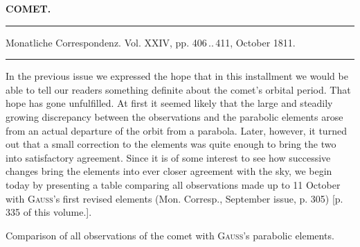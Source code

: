 \clearpage{}\hypertarget{native-343-lower}{}\label{native-343-lower}
\begin{center}\textbf{COMET.}\par\vspace{4pt}\hrule\vspace{4pt}\fontsize{10}{12}\selectfont Monatliche Correspondenz. Vol. XXIV, pp. 406\,..\,411, October 1811.\par\vspace{4pt}\hrule\vspace{4pt}\end{center}

\par\indent In the previous issue we expressed the hope that in this installment we would be able to tell our readers something definite about the comet’s orbital period. That hope has gone unfulfilled. At first it seemed likely that the large and steadily growing discrepancy between the observations and the parabolic elements arose from an actual departure of the orbit from a parabola. Later, however, it turned out that a small correction to the elements was quite enough to bring the two into satisfactory agreement. Since it is of some interest to see how successive changes bring the elements into ever closer agreement with the sky, we begin today by presenting a table comparing all observations made up to 11 October with \textsc{Gauss}’s first revised elements (Mon. Corresp., September issue, p. 305) [p. 335 of this volume.].

Comparison of all observations of the comet with \textsc{Gauss}’s parabolic elements.

